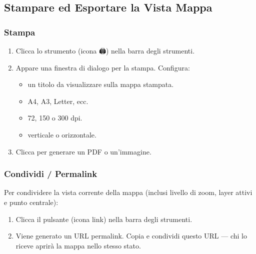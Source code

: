 \documentclass[letterpaper,10pt,english]{sphinxmanual}
\begin{document}
\subsection{Stampare ed Esportare la Vista Mappa}
\label{\detokenize{it/04_esplorare_mappe:stampare-ed-esportare-la-vista-mappa}}

\subsubsection{Stampa}
\label{\detokenize{it/04_esplorare_mappe:stampa}}\begin{enumerate}
%
\item {} 
\sphinxAtStartPar
Clicca lo strumento  (icona 🖨) nella barra degli strumenti.

\item {} 
\sphinxAtStartPar
Appare una finestra di dialogo per la stampa. Configura:
\begin{itemize}
\item {} 
\sphinxAtStartPar
{} \textendash{} un titolo da visualizzare sulla mappa stampata.

\item {} 
\sphinxAtStartPar
{} \textendash{} A4, A3, Letter, ecc.

\item {} 
\sphinxAtStartPar
{} \textendash{} 72, 150 o 300 dpi.

\item {} 
\sphinxAtStartPar
{} \textendash{} verticale o orizzontale.

\end{itemize}

\item {} 
\sphinxAtStartPar
Clicca  per generare un PDF o un’immagine.

\end{enumerate}


\subsubsection{Condividi / Permalink}
\label{\detokenize{it/04_esplorare_mappe:condividi-permalink}}
\sphinxAtStartPar
Per condividere la vista corrente della mappa (inclusi livello di zoom, layer attivi
e punto centrale):
\begin{enumerate}
%
\item {} 
\sphinxAtStartPar
Clicca il pulsante  (icona link) nella barra degli strumenti.

\item {} 
\sphinxAtStartPar
Viene generato un URL permalink. Copia e condividi questo URL — chi lo riceve aprirà
la mappa nello stesso stato.

\end{enumerate}
\end{document}

